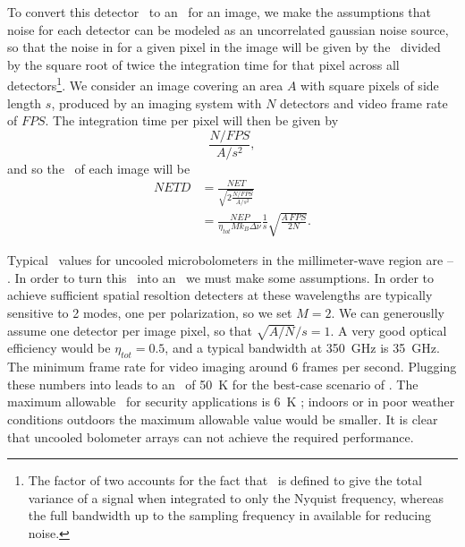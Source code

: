 To convert this detector \NET\ to an \NETD\ for an image, we make the assumptions that noise for each detector can be modeled as an uncorrelated gaussian noise source, so that the noise in for a given pixel in the image will be given by the \NET\ divided by the square root of twice the integration time for that pixel across all detectors\footnote{%
  The factor of two accounts for the fact that \NEP\ is defined to give the total variance of a signal when integrated to only the Nyquist frequency, whereas the full bandwidth up to the sampling frequency in available for reducing noise.
}. 
We consider an image covering an area $A$ with square pixels of side length $s$, produced by an imaging system with $N$ detectors and video frame rate of $FPS$.
The integration time per pixel will then be given by
\begin{equation}
  \frac{N / FPS}{A / s^2},
\end{equation}
and so the \NETD\ of each image will be
\begin{align}
  NETD & = \frac{NET}{\sqrt{ 2 \frac{N / FPS}{A / s^2}}} \\
       & = \frac{NEP}{\eta_{tot} M k_B \Delta \nu} \frac{1}{s} \sqrt{\frac{A\,FPS}{2 N}} .
       \label{eqn:ch1-netd-defn}
\end{align}

Typical \NEP\ values for uncooled microbolometers in the millimeter-wave region are -- \cite{nemarich_microbolometer_2005}.
In order to turn this \NEP\ into an \NETD\ we must make some assumptions.
In order to achieve sufficient spatial resoltion detecters at these wavelengths are typically sensitive to 2 modes, one per polarization, so we set $M = 2$.
We can generouslly assume one detector per image pixel, so that $\sqrt{A/N}/s = 1$.
A very good optical efficiency would be $\eta_{tot} = 0.5$, and a typical bandwidth at \SI{350}{\GHz} is \SI{35}{\GHz}.
The minimum frame rate for video imaging around 6 frames per second.
Plugging these numbers into  leads to an \NETD\ of \SI{50}{\K} for the best-case scenario of  \NEP.
The maximum allowable \NETD\ for security applications is \SI{6}{\K} \cite{nemarich_microbolometer_2005}; indoors or in poor weather conditions outdoors the maximum allowable value would be smaller.
It is clear that uncooled bolometer arrays can not achieve the required performance.


